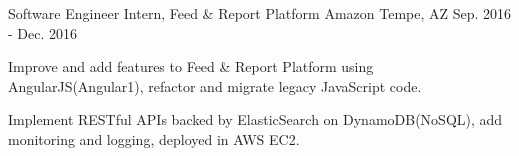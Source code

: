 \begin{cventries}
	\cventry
	{Software Engineer Intern, Feed \& Report Platform} %
	{Amazon} %
	{Tempe, AZ} %
	{Sep. 2016 - Dec. 2016} %
	{
		\begin{cvitems}
			\item Improve and add features to Feed \& Report Platform using AngularJS(Angular1), refactor and migrate legacy JavaScript code.
			\item Implement RESTful APIs backed by ElasticSearch on DynamoDB(NoSQL), add monitoring and logging, deployed in AWS EC2.
		\end{cvitems}
	}



\end{cventries}